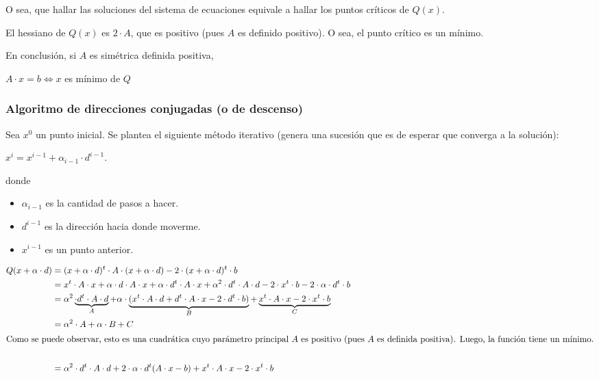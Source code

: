 \documentclass[]{article}
\begin{document}
O sea, que hallar las soluciones del sistema de ecuaciones equivale a hallar los puntos críticos de $Q(x)$.

El hessiano de $Q(x)$ es $2\cdot A$, que es positivo (pues $A$ es definido positivo). O sea, el punto crítico es un mínimo.

En conclusión, si $A$ es simétrica definida positiva,
\begin{center}
	$A\cdot x = b \Leftrightarrow x$ es mínimo de $Q$
\end{center}


\subsubsection{Algoritmo de direcciones conjugadas (o de descenso)}
Sea $x^0$ un punto inicial. Se plantea el siguiente método iterativo (genera una sucesión que es de esperar que converga a la solución):

$x^i = x^{i-1} + \alpha_{i-1}\cdot d^{i-1}$.

donde
\begin{itemize}
	\item $\alpha_{i-1}$ es la cantidad de pasos a hacer.
	\item $d^{i-1}$ es la dirección hacia donde moverme.
	\item $x^{i-1}$ es un punto anterior.
\end{itemize}

\begin{align*}
	Q(x+\alpha\cdot d) &= (x+\alpha\cdot d)^t \cdot A \cdot (x + \alpha\cdot d) - 2\cdot(x+\alpha\cdot d)^t\cdot b\\
	&= x^t\cdot A \cdot x + \alpha\cdot d\cdot A \cdot x + \alpha \cdot d^t \cdot A \cdot x + \alpha^2 \cdot d^t \cdot A \cdot d - 2 \cdot x^t \cdot b - 2 \cdot \alpha \cdot d^t \cdot b\\
	&= \alpha^2 \underbrace{\cdot d^t \cdot A \cdot d}_A + \alpha \cdot\underbrace{(x^t \cdot A \cdot d + d^t \cdot A \cdot x - 2 \cdot d^t \cdot b)}_B + \underbrace{x^t\cdot A \cdot x - 2\cdot x^t \cdot b}_C \\
	&= \alpha^2 \cdot A + \alpha \cdot B + C\\
	\intertext{Como se puede observar, esto es una cuadrática cuyo parámetro principal $A$ es positivo (pues $A$ es definida positiva). Luego, la función tiene un mínimo.}\\
	&= \alpha^2 \cdot d^t \cdot A \cdot d + 2 \cdot \alpha \cdot d^t (A\cdot x - b) + x^t\cdot A \cdot x - 2 \cdot x^t \cdot b
\end{align*}
\end{document}
